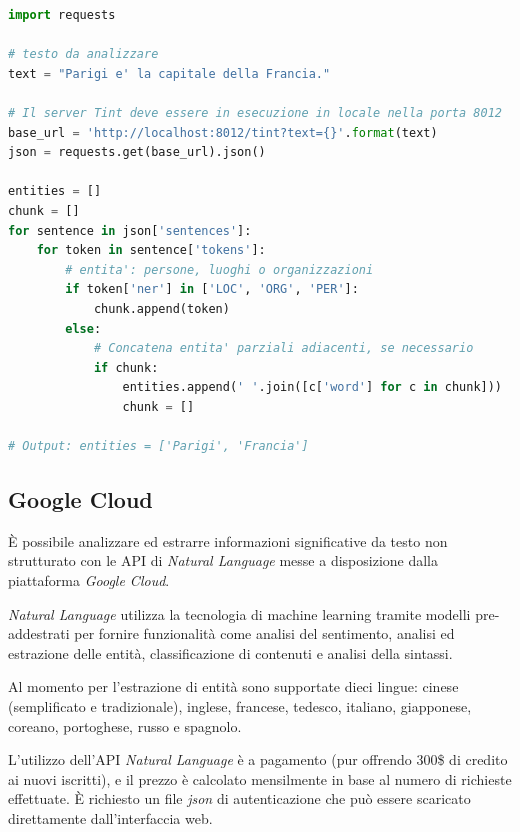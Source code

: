 \documentclass[a4paper,11pt]{article}
\begin{document}
\begin{lstlisting}[basicstyle=\small, language=python, frame=single, caption={Esempio di codice Python per l'estrazione di entità con \textit{Tint}.},captionpos=b]
import requests

# testo da analizzare
text = "Parigi e' la capitale della Francia."

# Il server Tint deve essere in esecuzione in locale nella porta 8012
base_url = 'http://localhost:8012/tint?text={}'.format(text)
json = requests.get(base_url).json()

entities = []
chunk = []
for sentence in json['sentences']:
    for token in sentence['tokens']:
        # entita': persone, luoghi o organizzazioni
        if token['ner'] in ['LOC', 'ORG', 'PER']:
            chunk.append(token)
        else:
            # Concatena entita' parziali adiacenti, se necessario
            if chunk:
                entities.append(' '.join([c['word'] for c in chunk]))
                chunk = []

# Output: entities = ['Parigi', 'Francia']
\end{lstlisting}

\subsection{Google Cloud}
\label{extractor:gcloud}
È possibile analizzare ed estrarre informazioni significative da testo non strutturato con le API di \textit{Natural Language} messe a disposizione dalla piattaforma \textit{Google Cloud}. \cite{gcloud}

\textit{Natural Language} utilizza la tecnologia di machine learning tramite modelli pre-addestrati per fornire funzionalità come analisi del sentimento, analisi ed estrazione delle entità, classificazione di contenuti e analisi della sintassi.

Al momento per l'estrazione di entità sono supportate dieci lingue: cinese (semplificato e tradizionale), inglese, francese, tedesco, italiano, giapponese, coreano, portoghese, russo e spagnolo.
\newline

L'utilizzo dell'API \textit{Natural Language} è a pagamento (pur offrendo 300\$ di credito ai nuovi iscritti), e il prezzo è calcolato mensilmente in base al numero di richieste effettuate. È richiesto un file \textit{json} di autenticazione che può essere scaricato direttamente dall'interfaccia web.
\end{document}

